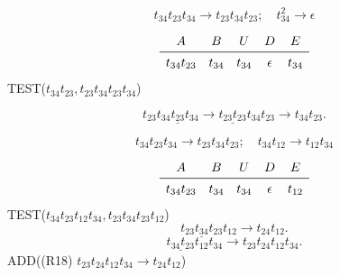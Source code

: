 \documentclass[worked-example]{subfiles}
\begin{document}
\[
t_{34} t_{23} t_{34} \rightarrow t_{23} t_{34} t_{23}; \quad
t_{34}^2 \rightarrow \epsilon
\]

\[
\begin{array}{ccccc}
A & B & U & D & E \\
\midrule
t_{34}t_{23} & t_{34} & t_{34} & \epsilon & t_{34}\\
\end{array}
\]
TEST($t_{34}t_{23}, t_{23} t_{34} t_{23}t_{34}$)

\[
t_{23} \underline{t_{34} t_{23}t_{34}}  \rightarrow \underline{t_{23} t_{23}} t_{34}t_{23} \rightarrow t_{34}t_{23}.
\]

\[
t_{34} t_{23} t_{34} \rightarrow t_{23} t_{34} t_{23}; \quad
t_{34} t_{12} \rightarrow t_{12} t_{34}
\]

\[
\begin{array}{ccccc}
A & B & U & D & E \\
\midrule
t_{34}t_{23} & t_{34} & t_{34} & \epsilon & t_{12}\\
\end{array}
\]
TEST($t_{34}t_{23}t_{12} t_{34}, t_{23} t_{34} t_{23}t_{12}$)
\[
\underline{t_{23} t_{34} t_{23}}t_{12} \rightarrow t_{24} t_{12}.
\]
\[
\underline{t_{34}t_{23}}t_{12} t_{34} \rightarrow t_{23} t_{24} t_{12} t_{34}.
\]
ADD((R18) $t_{23} t_{24} t_{12} t_{34} \rightarrow t_{24} t_{12}$)
\end{document}
